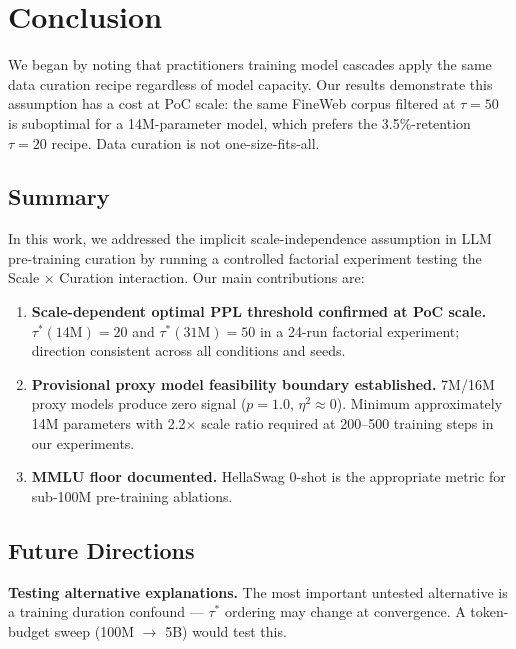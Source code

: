 \section{Conclusion}
\label{sec:conclusion}

We began by noting that practitioners training model cascades apply the same data curation recipe regardless of model capacity. Our results demonstrate this assumption has a cost at PoC scale: the same FineWeb corpus filtered at $\tau{=}50$ is suboptimal for a 14M-parameter model, which prefers the 3.5\%-retention $\tau{=}20$ recipe. Data curation is not one-size-fits-all.

\subsection{Summary}

In this work, we addressed the implicit scale-independence assumption in LLM pre-training curation by running a controlled factorial experiment testing the Scale $\times$ Curation interaction. Our main contributions are:

\begin{enumerate}
\item \textbf{Scale-dependent optimal PPL threshold confirmed at PoC scale.} $\tau^*(14\text{M}){=}20$ and $\tau^*(31\text{M}){=}50$ in a 24-run factorial experiment; direction consistent across all conditions and seeds.

\item \textbf{Provisional proxy model feasibility boundary established.} 7M/16M proxy models produce zero signal ($p{=}1.0$, $\eta^2{\approx}0$). Minimum approximately 14M parameters with 2.2$\times$ scale ratio required at 200--500 training steps in our experiments.

\item \textbf{MMLU floor documented.} HellaSwag 0-shot is the appropriate metric for sub-100M pre-training ablations.
\end{enumerate}

\subsection{Future Directions}

\textbf{Testing alternative explanations.} The most important untested alternative is a training duration confound --- $\tau^*$ ordering may change at convergence. A token-budget sweep (100M $\rightarrow$ 5B) would test this.

